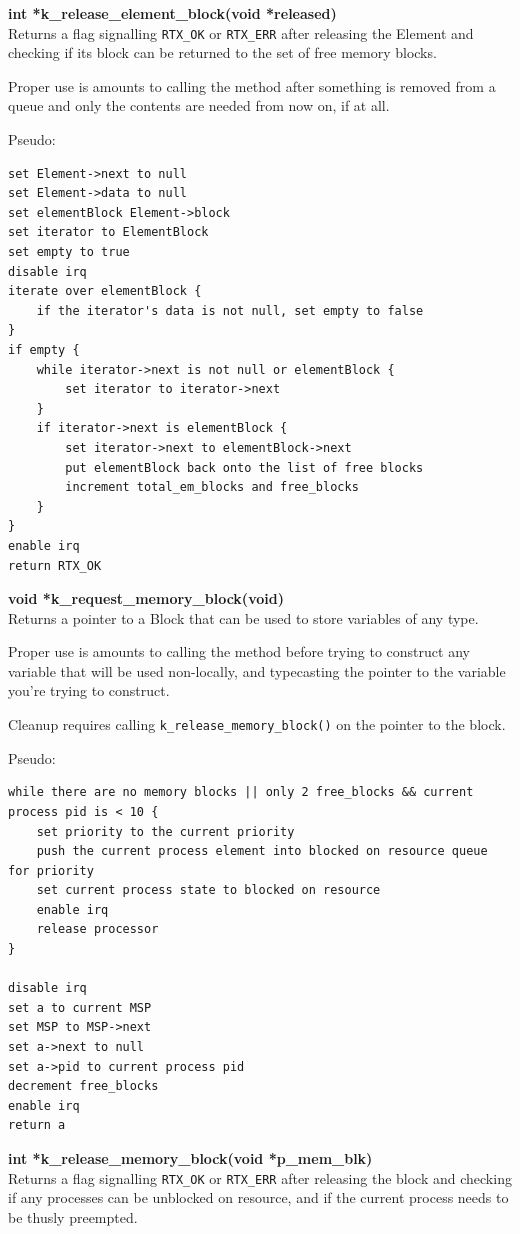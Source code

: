 \documentclass[11pt, oneside]{article}
\begin{document}
{\bf int *k\_release\_element\_block(void *released)}\\
Returns a flag signalling {\tt RTX\_OK} or {\tt RTX\_ERR} after releasing the Element and checking if its block can be returned to the set of free memory blocks.

Proper use is amounts to calling the method after something is removed from a queue and only the contents are needed from now on, if at all.

Pseudo:
\begin{verbatim}
set Element->next to null
set Element->data to null
set elementBlock Element->block
set iterator to ElementBlock
set empty to true
disable irq
iterate over elementBlock {
    if the iterator's data is not null, set empty to false
}
if empty {
    while iterator->next is not null or elementBlock {
        set iterator to iterator->next
    }
    if iterator->next is elementBlock {
        set iterator->next to elementBlock->next
        put elementBlock back onto the list of free blocks
        increment total_em_blocks and free_blocks
    }
}
enable irq
return RTX_OK
\end{verbatim}


{\bf void *k\_request\_memory\_block(void)}\\
Returns a pointer to a Block that can be used to store variables of any type.

Proper use is amounts to calling the method before trying to construct any variable that will be used non-locally, and typecasting the pointer to the variable you're trying to construct.

Cleanup requires calling {\tt k\_release\_memory\_block()} on the pointer to the block.

Pseudo:
\begin{verbatim}
while there are no memory blocks || only 2 free_blocks && current process pid is < 10 {
    set priority to the current priority
    push the current process element into blocked on resource queue for priority
    set current process state to blocked on resource
    enable irq
    release processor
}

disable irq
set a to current MSP
set MSP to MSP->next
set a->next to null
set a->pid to current process pid
decrement free_blocks
enable irq
return a
\end{verbatim}

{\bf int *k\_release\_memory\_block(void *p\_mem\_blk)}\\
Returns a flag signalling {\tt RTX\_OK} or {\tt RTX\_ERR} after releasing the block and checking if any processes can be unblocked on resource, and if the current process needs to be thusly preempted.
\end{document}
